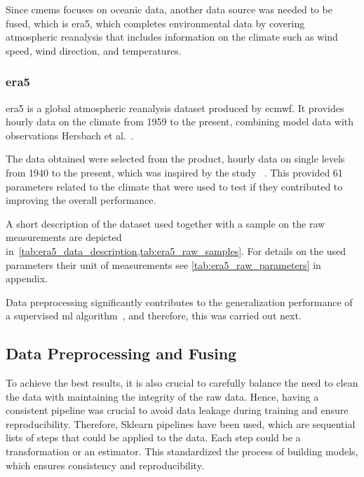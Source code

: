 Since \ac{cmems} focuses on oceanic data, another data source was needed to be fused, which is \ac{era5}, which completes environmental data by covering atmospheric reanalysis that includes information on the climate such as wind speed, wind direction, and temperatures. 





\subsubsection{\ac{era5}}\label{sec:era5}

\ac{era5} is a global atmospheric reanalysis dataset produced by \ac{ecmwf}. It provides hourly data on the climate from 1959 to the present, combining model data with observations Hersbach et al.~\citep{hersbach2023era5}.

The data obtained were selected from the product, hourly data on single levels from 1940 to the present, which was inspired by the study ~\citep{liDataFusionMachine2022}. This provided 61 parameters related to the climate that were used to test if they contributed to improving the overall performance.

A short description of the dataset used together with a sample on the raw measurements are depicted in~\cref{tab:era5_data_description,tab:era5_raw_samples}.
For details on the used parameters their unit of measurements see \cref{tab:era5_raw_parameters} in appendix.

\clearpage





Data preprocessing significantly contributes to the generalization performance of a supervised \ac{ml} algorithm~\citep{xieFuelConsumptionPrediction2023}, and therefore, this was carried out next. 


\subsection{Data Preprocessing and Fusing}\label{sec:data_preprocessing_and_fusing}

To achieve the best results, it is also crucial to carefully balance the need to clean the data with maintaining the integrity of the raw data. Hence, having a consistent pipeline was crucial to avoid data leakage during training and ensure reproducibility. Therefore, Sklearn pipelines have been used, which are sequential lists of steps that could be applied to the data. Each step could be a transformation or an estimator. This standardized the process of building models, which ensures consistency and reproducibility.

